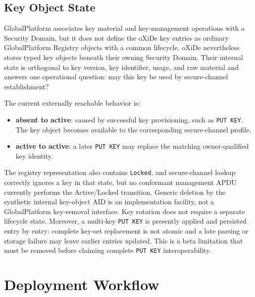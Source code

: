 \subsection{Key Object State}
\label{sec:gp-lifecycle-key}

GlobalPlatform associates key material and key-management operations with a
Security Domain, but it does not define the oXiDe key entries as ordinary
GlobalPlatform Registry objects with a common lifecycle. oXiDe nevertheless
stores typed key objects beneath their owning Security Domain. Their internal
state is orthogonal to key version, key identifier, usage, and raw material and
answers one operational question: may this key be used by secure-channel
establishment?

The current externally reachable behavior is:

\begin{itemize}
\item \textbf{absent to active}: caused by successful key provisioning, such
  as \texttt{PUT KEY}. The key object becomes available to the corresponding
  secure-channel profile.
\item \textbf{active to active}: a later \texttt{PUT KEY} may replace the
  matching owner-qualified key identity.
\end{itemize}

The registry representation also contains \texttt{Locked}, and secure-channel
lookup correctly ignores a key in that state, but no conformant management APDU
currently performs the Active/Locked transition. Generic deletion by the
synthetic internal key-object AID is an implementation facility, not a
GlobalPlatform key-removal interface. Key rotation does not require a separate
lifecycle state. Moreover, a multi-key \texttt{PUT KEY} is presently applied
and persisted entry by entry: complete key-set replacement is not atomic and a
late parsing or storage failure may leave earlier entries updated. This is a
beta limitation that must be removed before claiming complete
\texttt{PUT KEY} interoperability.

\section{Deployment Workflow}
\label{sec:gp-deployment-workflow}


